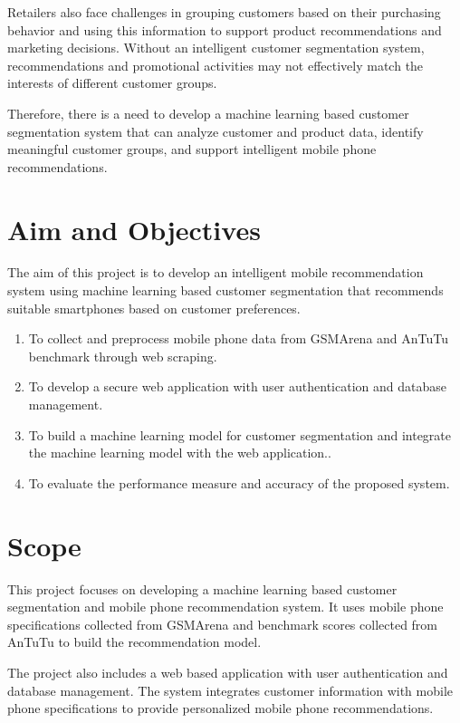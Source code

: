 \documentclass[12pt, a4paper]{report}
\numberwithin{figure}{chapter}
\numberwithin{table}{chapter}
\numberwithin{equation}{chapter}
\begin{document}
Retailers also face challenges in grouping customers based on their purchasing behavior and using this information to support product recommendations and marketing decisions. Without an intelligent customer segmentation system, recommendations and promotional activities may not effectively match the interests of different customer groups.

Therefore, there is a need to develop a machine learning based customer segmentation system that can analyze customer and product data, identify meaningful customer groups, and support intelligent mobile phone recommendations.

\section{Aim and Objectives}

The aim of this project is to develop an intelligent mobile recommendation system using machine learning based customer segmentation that recommends suitable smartphones based on customer preferences.

\begin{enumerate}[label=\Roman*.]
    \item To collect and preprocess mobile phone data from GSMArena and AnTuTu benchmark through web scraping.
    
    \item To develop a secure web application with user authentication and database management.
    
    \item To build a machine learning model for customer segmentation and integrate the machine learning model with the web application..
        
    \item To evaluate the performance measure and accuracy of the proposed system.
\end{enumerate}

\section{Scope}

This project focuses on developing a machine learning based customer segmentation and mobile phone recommendation system. It uses mobile phone specifications collected from GSMArena and benchmark scores collected from AnTuTu to build the recommendation model.

The project also includes a web based application with user authentication and database management. The system integrates customer information with mobile phone specifications to provide personalized mobile phone recommendations.
\end{document}

